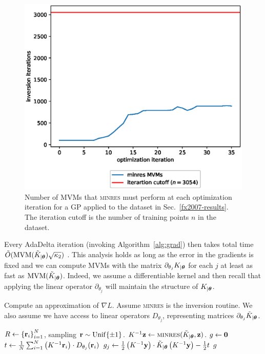\documentclass{article}
\begin{document}
\begin{figure}[!h]
\centering
\includegraphics[width=0.5\columnwidth]{iterations.eps}
\caption{Number of MVMs that \textsc{minres} must perform at each optimization iteration for a GP applied to the dataset in Sec.~\ref{fx2007-results}. The iteration cutoff is the number of training points $n$ in the dataset.
}
\label{fx2007-iterations}
\end{figure}

Every AdaDelta iteration (invoking Algorithm~\ref{alg:grad}) then takes total time $\tilde{O}(\operatorname{MVM}(\tilde{K}_{|{\boldsymbol\theta}})\sqrt{\kappa_2})$ \cite{raykar2007fast}. This analysis holds as long as the error in the gradients is fixed and we can compute MVMs with the matrix $\partial_{\theta_j}K_{|{\boldsymbol\theta}}$ for each $j$ at least as fast as $\operatorname{MVM}({\tilde{K}_{|{\boldsymbol\theta}}})$. Indeed, we assume a differentiable kernel and then recall that applying the linear operator $\partial_{\theta_j}$ will maintain the structure of $K_{|{\boldsymbol\theta}}$.

\begin{algorithm}[!ht]
  \caption{Compute an approximation of $\nabla L$. Assume \textsc{minres} is the inversion routine. We also assume we have access to linear operators $D_{\theta_j}$, representing matrices $\partial_{\theta_j}\tilde{K}_{|{\boldsymbol\theta}}$.} \label{alg:grad}
\begin{algorithmic}[1]
  \State $R\gets\left\{ {\textbf{r}}_i \right\}_{ i=1 }^{ N }$, sampling ${\textbf{r}}\sim\operatorname{Unif}\{\pm 1\}$.
\State $K^{-1}\textbf{z}\gets\textsc{minres}(\tilde{K}_{|{\boldsymbol\theta}},\textbf{z})$.
\EndFor
\State $g\gets \textbf{0}$
\State $t\gets \frac{1}{N}\sum_{i=1}^{N}\left({K^{-1}{\textbf{r}}_i}\right)\cdot D_{\theta_j}({\textbf{r}}_i)$
\State $g_j\gets \frac{1}{2}\left({K^{-1}\textbf{y}}\right)\cdot \tilde{K}_{|{\boldsymbol\theta}}\left({K^{-1}\textbf{y}}\right)-\frac{1}{2}t$
\EndFor
\State \Return $g$ 
\EndProcedure
\end{algorithmic}
\end{algorithm}
\end{document}
